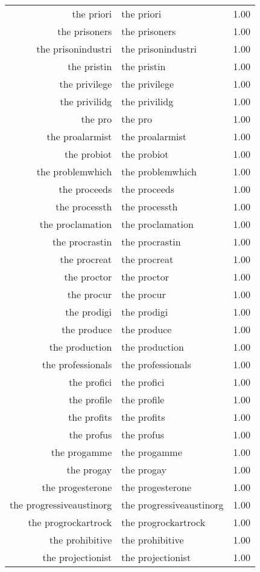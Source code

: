 \begin{table}[ht]
\begin{tabular}{rlr}
  the priori & the priori & 1.00 \\ 
  the prisoners & the prisoners & 1.00 \\ 
  the prisonindustri & the prisonindustri & 1.00 \\ 
  the pristin & the pristin & 1.00 \\ 
  the privilege & the privilege & 1.00 \\ 
  the privilidg & the privilidg & 1.00 \\ 
  the pro & the pro & 1.00 \\ 
  the proalarmist & the proalarmist & 1.00 \\ 
  the probiot & the probiot & 1.00 \\ 
  the problemwhich & the problemwhich & 1.00 \\ 
  the proceeds & the proceeds & 1.00 \\ 
  the processth & the processth & 1.00 \\ 
  the proclamation & the proclamation & 1.00 \\ 
  the procrastin & the procrastin & 1.00 \\ 
  the procreat & the procreat & 1.00 \\ 
  the proctor & the proctor & 1.00 \\ 
  the procur & the procur & 1.00 \\ 
  the prodigi & the prodigi & 1.00 \\ 
  the produce & the produce & 1.00 \\ 
  the production & the production & 1.00 \\ 
  the professionals & the professionals & 1.00 \\ 
  the profici & the profici & 1.00 \\ 
  the profile & the profile & 1.00 \\ 
  the profits & the profits & 1.00 \\ 
  the profus & the profus & 1.00 \\ 
  the progamme & the progamme & 1.00 \\ 
  the progay & the progay & 1.00 \\ 
  the progesterone & the progesterone & 1.00 \\ 
  the progressiveaustinorg & the progressiveaustinorg & 1.00 \\ 
  the progrockartrock & the progrockartrock & 1.00 \\ 
  the prohibitive & the prohibitive & 1.00 \\ 
  the projectionist & the projectionist & 1.00 \\ 

\end{tabular}
\end{table}
